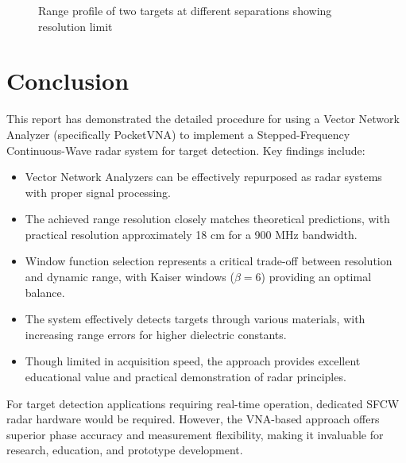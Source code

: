 \documentclass[12pt,a4paper]{article}
\begin{document}
\begin{figure}[H]
    \centering
    \caption{Range profile of two targets at different separations showing resolution limit}
    \label{fig:resolution}
\end{figure}

\section{Conclusion}

This report has demonstrated the detailed procedure for using a Vector Network Analyzer (specifically PocketVNA) to implement a Stepped-Frequency Continuous-Wave radar system for target detection. Key findings include:

\begin{itemize}
    \item Vector Network Analyzers can be effectively repurposed as radar systems with proper signal processing.
    
    \item The achieved range resolution closely matches theoretical predictions, with practical resolution approximately 18 cm for a 900 MHz bandwidth.
    
    \item Window function selection represents a critical trade-off between resolution and dynamic range, with Kaiser windows ($\beta = 6$) providing an optimal balance.
    
    \item The system effectively detects targets through various materials, with increasing range errors for higher dielectric constants.
    
    \item Though limited in acquisition speed, the approach provides excellent educational value and practical demonstration of radar principles.
\end{itemize}

For target detection applications requiring real-time operation, dedicated SFCW radar hardware would be required. However, the VNA-based approach offers superior phase accuracy and measurement flexibility, making it invaluable for research, education, and prototype development.
\end{document}

